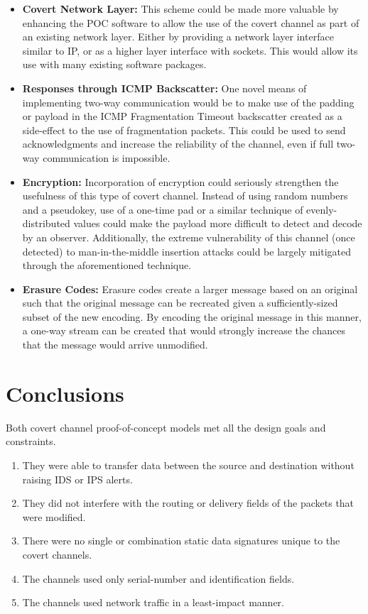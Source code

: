 \documentclass[letterpaper,10pt,draft]{article}
\begin{document}
\begin{itemize}
\item \textbf{Covert Network Layer:} This scheme could be made more
valuable by enhancing the POC software to allow the use of the covert
channel as part of an existing network layer.  Either by providing a
network layer interface similar to IP, or as a higher layer interface
with sockets.  This would allow its use with many existing software
packages.

\item \textbf{Responses through ICMP Backscatter:}  One novel means of
implementing two-way communication would be to make use of the padding
or payload in the ICMP Fragmentation Timeout backscatter created as a
side-effect to the use of fragmentation packets.  This could be used
to send acknowledgments and increase the reliability of the channel,
even if full two-way communication is impossible.

\item \textbf{Encryption:} Incorporation of encryption could seriously
strengthen the usefulness of this type of covert channel.  Instead of
using random numbers and a pseudokey, use of a one-time pad or a
similar technique of evenly-distributed values could make the payload
more difficult to detect and decode by an observer.  Additionally, the
extreme vulnerability of this channel (once detected) to
man-in-the-middle insertion attacks could be largely mitigated through
the aforementioned technique.

\item \textbf{Erasure Codes:} Erasure codes create a larger message
based on an original such that the original message can be recreated
given a sufficiently-sized subset of the new encoding.  By encoding
the original message in this manner, a one-way stream can be created
that would strongly increase the chances that the message would arrive
unmodified.
\end{itemize}


\section{Conclusions}

Both covert channel proof-of-concept models met all the design goals
and constraints.

\begin{enumerate}
\item They were able to transfer data between the source and
destination without raising IDS or IPS alerts.
\item They did not interfere with the routing or delivery fields of
the packets that were modified.
\item There were no single or combination static data signatures unique to
the covert channels.
\item The channels used only serial-number and identification fields.
\item The channels used network traffic in a least-impact manner.
\end{enumerate}

\end{document}

